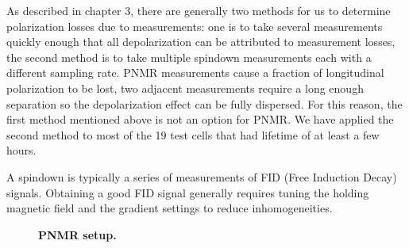 As described in chapter 3, there are generally two methods for us to determine polarization losses due to measurements: one is to take several measurements quickly enough that all depolarization can be attributed to measurement losses, the second method is to take multiple spindown measurements each with a different sampling rate. PNMR measurements cause a fraction of longitudinal polarization to be lost, two adjacent measurements require a long enough separation so the depolarization effect can be fully dispersed. For this reason, the first method mentioned above is not an option for PNMR. We have applied the second method to most of the 19 test cells that had lifetime of at least a few hours.

A spindown is typically a series of measurements of FID (Free Induction Decay) signals. Obtaining a good FID signal generally requires tuning the holding magnetic field and the gradient settings to reduce inhomogeneities.

\begin{figure}[t!]
	\centering
	\caption{{\bf PNMR setup.}}
	\label{PNMR_setup}
\end{figure}

